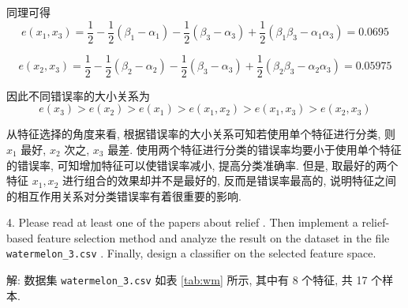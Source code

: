 \documentclass[openany]{ctexbook}
\theoremstyle{kaiti}
\theoremstyle{normal}
\begin{document}
同理可得
\begin{equation}
  e(x_1,x_3)
  =\frac{1}{2}-\frac{1}{2}(\beta_1-\alpha_1)-\frac{1}{2}(\beta_3-\alpha_3)+\frac{1}{2}(\beta_1\beta_3-\alpha_1\alpha_3)
  =0.0695
\end{equation}

\begin{equation}
  e(x_2,x_3)
  =\frac{1}{2}-\frac{1}{2}(\beta_2-\alpha_2)-\frac{1}{2}(\beta_3-\alpha_3)+\frac{1}{2}(\beta_2\beta_3-\alpha_2\alpha_3)
  =0.05975
\end{equation}

因此不同错误率的大小关系为
\begin{equation}
  e(x_3)>e(x_2)>e(x_1)>e(x_1,x_2)>e(x_1,x_3)>e(x_2,x_3)
\end{equation}

从特征选择的角度来看, 根据错误率的大小关系可知若使用单个特征进行分类, 则 $x_1$ 最好, $x_2$ 次之, $x_3$ 最差. 使用两个特征进行分类的错误率均要小于使用单个特征的错误率, 可知增加特征可以使错误率减小, 提高分类准确率. 但是, 取最好的两个特征 $x_1,x_2$ 进行组合的效果却并不是最好的, 反而是错误率最高的, 说明特征之间的相互作用关系对分类错误率有着很重要的影响.

4. Please read at least one of the papers about relief \cite{ReliefF,Relief-based}. Then implement a relief-based feature selection method and analyze the result on the dataset in the file \verb|watermelon_3.csv| \cite{MLbook}. Finally, design a classifier on the selected feature space.

解: 数据集 \verb|watermelon_3.csv| 如表 \ref{tab:wm} 所示, 其中有 8 个特征, 共 17 个样本.
\end{document}
